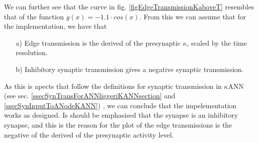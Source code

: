 			We can further see that the curve in fig. \ref{figEdgeTransmissionKaboveT} resembles that of the function $g(x)= - 1.1 \cdot cos(x)$. 
			From this we can assume that for the implementation, we have that
			\begin{itemize}
				\item[a)] Edge transmission is the derived of the presynaptic $\kappa$, scaled by the time resolution.
				\item[b)] Inhibitory synaptic transmission gives a negative synaptic transmission.
			\end{itemize}
			As this is apects that follow the definitions for synaptic transmission in $\kappa$ANN (see sec. \ref{ssecSynTransForANNliggeriKANNsection} and \ref{ssecSynInputToANodeKANN})
				, we can conclude that the impelementation works as designed.
			Is should be emphasised that the synapse is an inhibitory synapse, and this is the reason for the plot of the edge transmissions is the negative of the derived of the presynaptic activity level.

